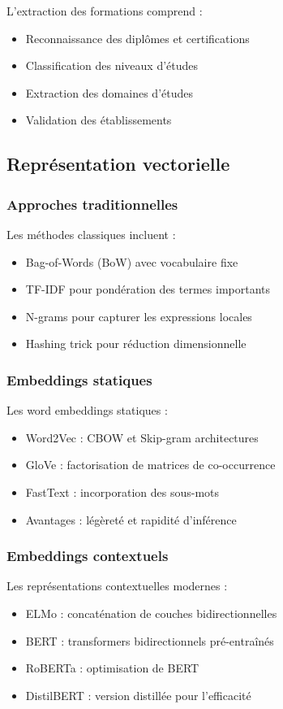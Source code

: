 \documentclass[12pt,a4paper]{report}
\begin{document}
L'extraction des formations comprend :
\begin{itemize}
\item Reconnaissance des diplômes et certifications
\item Classification des niveaux d'études
\item Extraction des domaines d'études
\item Validation des établissements
\end{itemize}

\subsection{Représentation vectorielle}

\subsubsection{Approches traditionnelles}

Les méthodes classiques incluent :
\begin{itemize}
\item Bag-of-Words (BoW) avec vocabulaire fixe
\item TF-IDF pour pondération des termes importants
\item N-grams pour capturer les expressions locales
\item Hashing trick pour réduction dimensionnelle
\end{itemize}

\subsubsection{Embeddings statiques}

Les word embeddings statiques :
\begin{itemize}
\item Word2Vec : CBOW et Skip-gram architectures
\item GloVe : factorisation de matrices de co-occurrence
\item FastText : incorporation des sous-mots
\item Avantages : légèreté et rapidité d'inférence
\end{itemize}

\subsubsection{Embeddings contextuels}

Les représentations contextuelles modernes :
\begin{itemize}
\item ELMo : concaténation de couches bidirectionnelles
\item BERT : transformers bidirectionnels pré-entraînés
\item RoBERTa : optimisation de BERT
\item DistilBERT : version distillée pour l'efficacité
\end{itemize}
\end{document}
